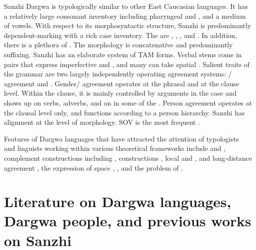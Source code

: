 Sanzhi Dargwa is typologically similar to other East Caucasian languages. It has a relatively large consonant inventory including pharyngeal and  , and a medium  of vowels. With respect to its morphosyntactic structure, Sanzhi is predominantly dependent-marking with a rich case inventory. The  are , , , and . In addition, there is a plethora of . The morphology is concatenative and predominantly suffixing. Sanzhi has an elaborate system of TAM forms. Verbal stems come in pairs that express imperfective and , and many can take spatial . Salient traits of the grammar are two largely independently operating agreement systems: / agreement and . Gender/ agreement operates at the phrasal and at the clause level. Within the clause, it is mainly controlled by arguments in the  case and shows up on verbs, adverbs, and on  in some of the . Person agreement operates at the clausal level only, and functions according to a person hierarchy. Sanzhi has  alignment at the level of morphology. SOV is the most frequent .

Features of Dargwa languages that have attracted the attention of typologists and linguists working within various theoretical frameworks include  and  \citep{Sumbatova2011, Sumbatova2013, Belyaev2013, Belyaev2017a, Belyaev2017b, GanenkovForthcoming, Forker2016a}, complement constructions including  \citep{Ganenkov2012, ForkerSubmittedb},  constructions \citep{Comrie.vandenBerg2006, Ganenkov2006, Ganenkov2013}, local and  \citep{Forker2014},  and long-distance agreement \citep{Serdobolskaya2009, Serdobolskaya2010, Belyaev2016}, the expression of space \citep{Ganenkov2010, ForkerLTSanzhi},  \citep{Sumbatova2009, Forker.Belyaev2016, Forker2016a}, and the problem of  \citep{Kalinina.Sumbatova2007}.



\section[Literature and previous works]{Literature on Dargwa languages, Dargwa people, and previous works on Sanzhi}
\label{sec:Literature on Dargwa languages, Dargwa people, and previous works on Sanzhi}

